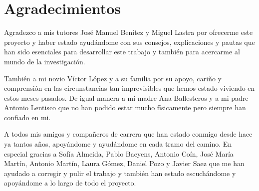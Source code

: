 

\chapter*{Agradecimientos}

Agradezco a mis tutores José Manuel Benítez y Miguel Lastra por ofrecerme este proyecto y haber estado ayudándome con sus consejos, explicaciones y pautas que han sido esenciales para desarrollar este trabajo y también para acercarme al mundo de la investigación.

También a mi novio Víctor López y a su familia por su apoyo, cariño y comprensión en las circunstancias tan imprevisibles que hemos estado viviendo en estos meses pasados. De igual manera a mi madre Ana Ballesteros y a mi padre Antonio Lentisco que no han podido estar mucho físicamente pero siempre han confiado en mi.

A todos mis amigos y compañeros de carrera que han estado conmigo desde hace ya tantos años, apoyándome y ayudándome en cada tramo del camino. En especial gracias a Sofía Almeida, Pablo Baeyens, Antonio Coín, José María Martín, Antonio Martín, Laura Gómez, Daniel Pozo y Javier Saez que me han ayudado a corregir y pulir el trabajo y también han estado escuchándome y apoyándome a lo largo de todo el proyecto.

\endinput
